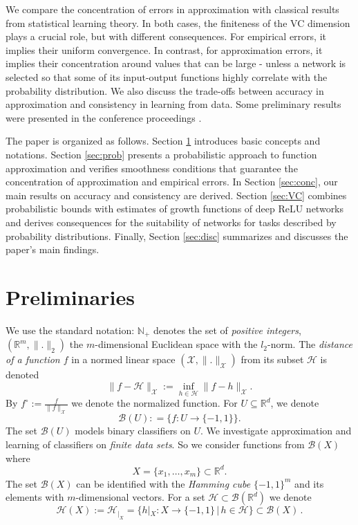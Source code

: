 \documentclass{elsarticle}
\def\n{\noindent}
\def\cH{{\mathcal H}}
\def\cB{{\mathcal B}}
\def\cX{{\mathcal X}}
\def\bR{{\mathbb R}}
\def\bN{{\mathbb N}}
\def\n{\noindent}
\begin{document}
We compare the concentration of errors in approximation with classical results from statistical learning theory. In both cases, the finiteness of the VC dimension plays a crucial role, but with different consequences. For empirical errors, it implies their uniform convergence. In contrast, for approximation errors, it implies their concentration around values that can be large - unless a network is selected so that some of its input-output functions highly correlate with the probability distribution. We also discuss the trade-offs between accuracy in approximation and consistency in learning from data.
Some preliminary results were presented in the conference proceedings \cite{vk23}.

The paper is organized as follows. Section \ref{sec:prel} introduces basic concepts and notations. Section \ref{sec:prob} presents a probabilistic approach to function approximation and verifies smoothness conditions that guarantee the concentration of  approximation and empirical errors. In Section \ref{sec:conc}, our main results on accuracy and consistency are derived. Section \ref{sec:VC} combines probabilistic bounds with estimates of growth functions of deep ReLU networks and derives consequences for the suitability of networks for tasks described by probability distributions.
Finally, Section \ref{sec:disc} summarizes and discusses the paper's main findings.



 \section{Preliminaries}
 \label{sec:prel}

We use the standard notation: $\bN_{+}$ denotes the set of {\em positive integers}, $(\bR^m, \| . \|_2)$  the $m$-dimensional Euclidean space with the $l_2$-norm.
The {\em distance of a function $f$} in a normed linear space $(\cX, \|.\|_{\cX})$ from its subset $\cH$ is denoted
$$\| f - \cH\|_{\cX} := \inf_{h \in \cH} \|f - h\|_{\cX}.$$
By $f^{\circ} := \frac{f}{\| f \|_{\cX}}$  we denote the normalized function. For $U \subseteq \bR^d$, we denote
$$\cB(U) : = \{ f : U \to \{-1,1\} \}.$$
The set $\cB(U)$ models binary classifiers on $U$. We investigate
approximation and learning of classifiers on {\em finite data sets}.
So we consider functions from $\cB(X)$  where $$X= \{x_1, \dots, x_m\} \subset \bR^d.$$ \n The set $\cB(X)$ can be identified with the {\em Hamming cube} $\{-1,1\}^m$ and its elements with $m$-dimensional vectors. For a set $\cH \subset \cB(\bR^d)$ we denote
$$\cH(X):= \cH_{|_X} = \{ h|_{X}: X \to \{-1,1\} \, | \, h \in \cH\} \subset \cB(X)\,.$$
\end{document}
